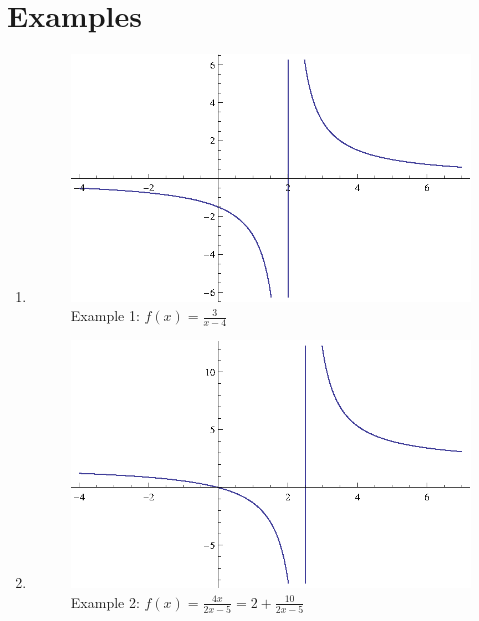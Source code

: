 \documentclass{exam}
\begin{document}
  \section{Examples}

  \begin{enumerate}

    \item
      \begin{figure}[H]
        \centering
        \includegraphics[scale=1.0]{example1.eps}
        \caption*{Example 1: $f(x) = \frac{3}{x - 4}$}
      \end{figure}

    \item
      \begin{figure}[H]
        \centering
        \includegraphics[scale=1.0]{example2.eps}
        \caption*{Example 2: $f(x) = \frac{4x}{2x - 5} = 2 + \frac{10}{2x - 5}$}
      \end{figure}


\end{enumerate}
\end{document}
